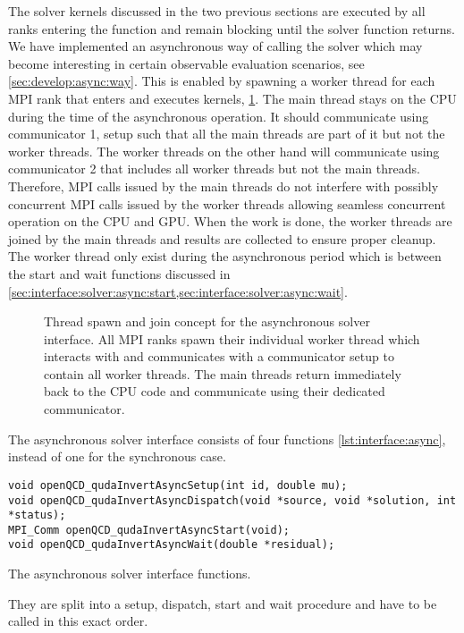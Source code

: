 The solver kernels discussed in the two previous sections are executed by all ranks entering the function and remain blocking until the solver function returns.
We have implemented an asynchronous way of calling the solver which may become interesting in certain observable evaluation scenarios, see \cref{sec:develop:async:way}.
This is enabled by spawning a worker thread for each MPI rank that enters \quda and executes kernels, \cref{fig:interface:async}.
The main thread stays on the CPU during the time of the asynchronous operation.
It should communicate using communicator \num{1}, setup such that all the main threads are part of it but not the worker threads.
The worker threads on the other hand will communicate using communicator \num{2} that includes all worker threads but not the main threads.
Therefore, MPI calls issued by the main threads do not interfere with possibly concurrent MPI calls issued by the worker threads allowing seamless concurrent operation on the CPU and GPU.
When the work is done, the worker threads are joined by the main threads and results are collected to ensure proper cleanup.
The worker thread only exist during the asynchronous period which is between the start and wait functions discussed in \cref{sec:interface:solver:async:start,sec:interface:solver:async:wait}.
\begin{figure}
  
  \caption{Thread spawn and join concept for the asynchronous solver interface. All MPI ranks spawn their individual worker thread which interacts with \quda and communicates with a communicator setup to contain all worker threads. The main threads return immediately back to the CPU code and communicate using their dedicated communicator.}
  \label{fig:interface:async}
\end{figure}

The asynchronous solver interface consists of four functions \cref{lst:interface:async}, instead of one for the synchronous case.
\begin{codelisting}
\begin{verbatim}
void openQCD_qudaInvertAsyncSetup(int id, double mu);
void openQCD_qudaInvertAsyncDispatch(void *source, void *solution, int *status);
MPI_Comm openQCD_qudaInvertAsyncStart(void);
void openQCD_qudaInvertAsyncWait(double *residual);
\end{verbatim}
\caption{The asynchronous solver interface functions.}
\label{lst:interface:async}
\end{codelisting}
They are split into a setup, dispatch, start and wait procedure and have to be called in this exact order.

